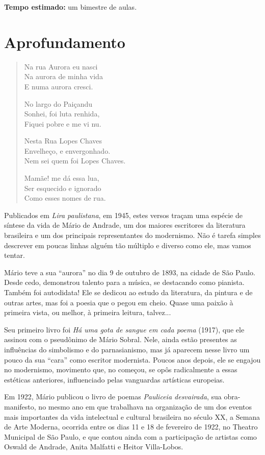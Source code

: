 \documentclass[12pt]{extarticle}
\begin{document}
\textbf{Tempo estimado:} um bimestre de aulas.

\section{Aprofundamento}

\begin{verse}
Na rua Aurora eu nasci\\
Na aurora de minha vida\\
E numa aurora cresci. 

No largo do Paiçandu\\
Sonhei, foi luta renhida,\\
Fiquei pobre e me vi nu. 

Nesta Rua Lopes Chaves\\
Envelheço, e envergonhado.\\
Nem sei quem foi Lopes Chaves. 

Mamãe! me dá essa lua,\\
Ser esquecido e ignorado\\
Como esses nomes de rua.
\end{verse}

Publicados em
\emph{Lira paulistana}, em 1945, estes versos traçam uma espécie de
síntese da vida de Mário de Andrade, um dos maiores escritores da
literatura brasileira e um dos principais representantes do modernismo.
Não é tarefa simples descrever em poucas linhas alguém tão múltiplo e
diverso como ele, mas vamos tentar.

Mário teve a sua ``aurora'' no dia 9 de outubro de 1893, na cidade de
São Paulo. Desde cedo, demonstrou talento para a música, se destacando
como pianista. Também foi autodidata! Ele se dedicou ao estudo da
literatura, da pintura e de outras artes, mas foi a poesia que o pegou
em cheio. Quase uma paixão à primeira vista, ou melhor, à primeira
leitura, talvez...

Seu primeiro livro foi \emph{Há uma gota de sangue em cada poema}
(1917), que ele assinou com o pseudônimo de Mário Sobral. Nele, ainda
estão presentes as influências do simbolismo e do parnasianismo, mas já
aparecem nesse livro um pouco da sua ``cara'' como escritor modernista.
Poucos anos depois, ele se engajou no modernismo, movimento que, no
começou, se opôs radicalmente a essas estéticas anteriores, influenciado
pelas vanguardas artísticas europeias.

Em 1922, Mário publicou o livro de poemas \emph{Pauliceia desvairada},
sua obra-manifesto, no mesmo ano em que trabalhava na organização de um
dos eventos mais importantes da vida intelectual e cultural brasileira
no século XX, a Semana de Arte Moderna, ocorrida entre os dias 11 e 18
de fevereiro de 1922, no Theatro Municipal de São Paulo, e que contou
ainda com a participação de artistas como Oswald de Andrade, Anita
Malfatti e Heitor Villa-Lobos.
\end{document}
